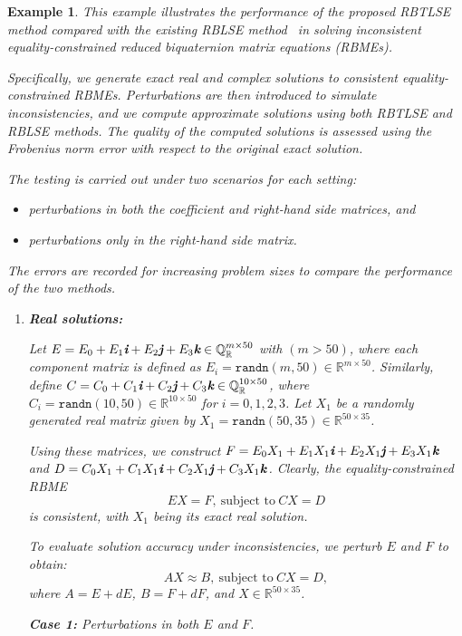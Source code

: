 \documentclass[preprint,11pt,3p]{elsarticle}
\newtheorem{example}[theorem]{Example}
\def \R{{\mathbb R}}
\def \QR{\mathbb{Q}_\mathbb{R}}
\def \i{\textit{\textbf{i}}}
\def \j{\textit{\textbf{j}}}
\def \k{\textit{\textbf{k}}}
\begin{document}
\begin{example} \label{ex5.4}
	This example illustrates the performance of the proposed RBTLSE method compared with the existing RBLSE method~\cite{ahmad2024solutions} in solving inconsistent equality-constrained reduced biquaternion matrix equations (RBMEs). 
	
	Specifically, we generate exact real and complex solutions to consistent equality-constrained RBMEs. Perturbations are then introduced to simulate inconsistencies, and we compute approximate solutions using both RBTLSE and RBLSE methods. The quality of the computed solutions is assessed using the Frobenius norm error with respect to the original exact solution. 
	
	The testing is carried out under two scenarios for each setting:  
	\begin{itemize}
	\item perturbations in both the coefficient and right-hand side matrices, and  
	\item perturbations only in the right-hand side matrix.  
	\end{itemize}
	The errors are recorded for increasing problem sizes to compare the performance of the two methods.
	\begin{enumerate}
		\item[\rm (i)] \textbf{Real solutions:}
		
		Let $E= E_0+E_1\i+E_2\j+E_3\k \in \QR^{m \times 50}$ with $(m>50)$, where each component matrix is defined as $E_i= \texttt{randn}(m,50) \in \R^{m \times 50}$. Similarly, define $C= C_0+C_1\i+C_2\j+C_3\k \in \QR^{10 \times 50}$, where $C_i= \texttt{randn}(10,50) \in \R^{10 \times 50}$ for $i=0,1,2,3$. Let $X_1$ be a randomly generated real matrix given by $X_1 = \texttt{randn}(50,35) \in \R^{50 \times 35}$.
		
		Using these matrices, we construct $F=E_0X_1+E_1X_1\i+E_2X_1\j+E_3X_1\k$ and $D=C_0X_1+C_1X_1\i+C_2X_1\j+C_3X_1\k$. Clearly, the equality-constrained RBME
		\begin{equation*}
			EX = F, ~ \textrm{subject to} ~ CX=D
		\end{equation*}
		is consistent, with $X_1$ being its exact real solution.
		
		To evaluate solution accuracy under inconsistencies, we perturb $E$ and $F$ to obtain:
		\[
		AX \approx B, ~ \text{subject to} ~ CX = D,
		\]
		where $A = E + dE$, $B = F + dF$, and $X \in \R^{50 \times 35}$.
		
		\textbf{Case 1:} Perturbations in both $E$ and $F$.
		

\end{enumerate}
\end{example}
\end{document}
